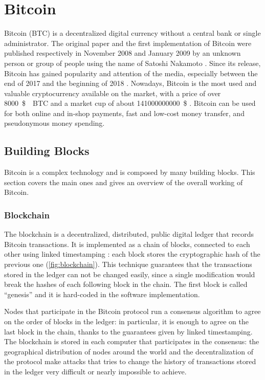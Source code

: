 \chapter{Bitcoin}
\label{chapter:bitcoin}
Bitcoin (BTC) is a decentralized digital currency without a central bank or single administrator.
The original paper \cite{bitcoin_2008} and the first implementation of Bitcoin were published respectively in November \num{2008} and January \num{2009} by an unknown person or group of people using the name of Satoshi Nakamoto \cite{bitcoin_website}.
Since its release, Bitcoin has gained popularity and attention of the media, especially between the end of \num{2017} and the beginning of \num{2018} \cite{bbc_2018, telegraph_2018, ilsole24ore_2018}.
Nowadays, Bitcoin is the most used and valuable cryptocurrency available on the market, with a price of over \SI{8000}{\$ \per BTC} and a market cup of about \SI{141000000000}{\$} \cite{bitcoin_usage_study_2017, stats_coinmarketcap, stats_coinranking, stats_cryptocompare, stats_coincheckup, stats_moonstats}.
Bitcoin can be used for both online and in-shop payments, fast and low-cost money transfer, and pseudonymous money spending.


\section{Building Blocks}
Bitcoin is a complex technology and is composed by many building blocks.
This section covers the main ones and gives an overview of the overall working of Bitcoin.


\subsection{Blockchain}
The blockchain is a decentralized, distributed, public digital ledger that records Bitcoin transactions.
It is implemented as a chain of blocks, connected to each other using linked timestamping \cite{bitcoin_book_narayanan_2016, hash_function_wikipedia}:
each block stores the cryptographic hash of the previous one (\cref{fig:blockchain}).
This technique guarantees that the transactions stored in the ledger can not be changed easily, since a single modification would break the hashes of each following block in the chain.
The first block is called ``genesis'' and it is hard-coded in the software implementation.

Nodes that participate in the Bitcoin protocol run a consensus algorithm to agree on the order of blocks in the ledger:
in particular, it is enough to agree on the last block in the chain, thanks to the guarantees given by linked timestamping.
The blockchain is stored in each computer that participates in the consensus:
the geographical distribution of nodes around the world and the decentralization of the protocol make attacks that tries to change the history of transactions stored in the ledger very difficult or nearly impossible to achieve.

